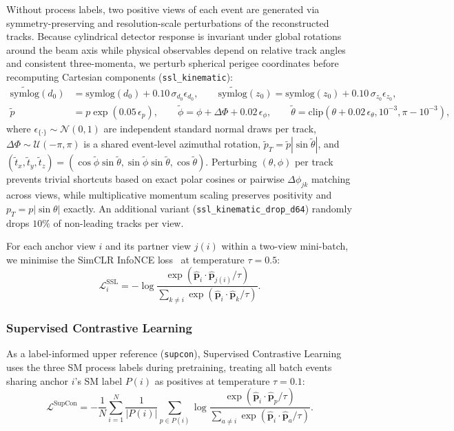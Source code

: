 \documentclass{article}
\begin{document}
Without process labels, two positive views of each event are generated via symmetry-preserving and resolution-scale perturbations of the reconstructed tracks. Because cylindrical detector response is invariant under global rotations around the beam axis while physical observables depend on relative track angles and consistent three-momenta, we perturb spherical perigee coordinates before recomputing Cartesian components (\texttt{ssl\_kinematic}):
\begin{align}
    \widetilde{\text{symlog}}(d_0) &= \text{symlog}(d_0) + 0.10\,\sigma_{d_0}\epsilon_{d_0}, \qquad
    \widetilde{\text{symlog}}(z_0) = \text{symlog}(z_0) + 0.10\,\sigma_{z_0}\epsilon_{z_0}, \nonumber \\
    \tilde{p} &= p \exp(0.05\,\epsilon_p), \qquad
    \tilde{\phi} = \phi + \Delta\Phi + 0.02\,\epsilon_\phi, \qquad
    \tilde{\theta} = \text{clip}(\theta + 0.02\,\epsilon_\theta, 10^{-3}, \pi - 10^{-3}),
    \label{eq:kinematic_aug}
\end{align}
where $\epsilon_{\{\cdot\}} \sim \mathcal{N}(0, 1)$ are independent standard normal draws per track, $\Delta\Phi \sim \mathcal{U}(-\pi, \pi)$ is a shared event-level azimuthal rotation, $\tilde{p}_T = \tilde{p}|\sin\tilde{\theta}|$, and $(\tilde{t}_x, \tilde{t}_y, \tilde{t}_z) = (\cos\tilde{\phi}\sin\tilde{\theta}, \sin\tilde{\phi}\sin\tilde{\theta}, \cos\tilde{\theta})$. Perturbing $(\theta, \phi)$ per track prevents trivial shortcuts based on exact polar cosines or pairwise $\Delta\phi_{jk}$ matching across views, while multiplicative momentum scaling preserves positivity and $p_T = p|\sin\theta|$ exactly. An additional variant (\texttt{ssl\_kinematic\_drop\_d64}) randomly drops $10\%$ of non-leading tracks per view.

For each anchor view $i$ and its partner view $j(i)$ within a two-view mini-batch, we minimise the SimCLR InfoNCE loss~\cite{SimCLR} at temperature $\tau = 0.5$:
\begin{equation}
    \mathcal{L}_i^{\text{SSL}} = -\log \frac{\exp(\hat{\mathbf{p}}_i \cdot \hat{\mathbf{p}}_{j(i)} / \tau)}{\sum_{k \neq i} \exp(\hat{\mathbf{p}}_i \cdot \hat{\mathbf{p}}_k / \tau)} .
\end{equation}

\subsubsection{Supervised Contrastive Learning}

As a label-informed upper reference (\texttt{supcon}), Supervised Contrastive Learning~\cite{SupCon} uses the three SM process labels during pretraining, treating all batch events sharing anchor $i$'s SM label $P(i)$ as positives at temperature $\tau = 0.1$:
\begin{equation}
    \mathcal{L}^{\text{SupCon}} = -\frac{1}{N}\sum_{i=1}^N \frac{1}{|P(i)|} \sum_{p \in P(i)} \log \frac{\exp(\hat{\mathbf{p}}_i \cdot \hat{\mathbf{p}}_p / \tau)}{\sum_{a \neq i} \exp(\hat{\mathbf{p}}_i \cdot \hat{\mathbf{p}}_a / \tau)} .
\end{equation}
\end{document}
